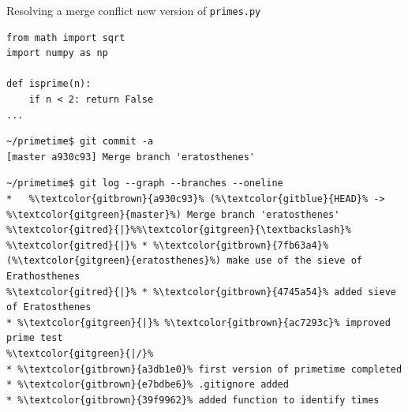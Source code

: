 \documentclass[svgnames]{beamer}
\begin{document}
\begin{frame}[fragile]{Resolving a merge conflict}
 new version of \texttt{primes.py}
 \begin{lstlisting}
from math import sqrt
import numpy as np

def isprime(n):
    if n < 2: return False
...
 \end{lstlisting}
 \begin{lstlisting}
~/primetime$ git commit -a
[master a930c93] Merge branch 'eratosthenes'
 \end{lstlisting}
 \begin{lstlisting}[escapechar=\%]
~/primetime$ git log --graph --branches --oneline
*   %\textcolor{gitbrown}{a930c93}% (%\textcolor{gitblue}{HEAD}% -> %\textcolor{gitgreen}{master}%) Merge branch 'eratosthenes'
%\textcolor{gitred}{|}%%\textcolor{gitgreen}{\textbackslash}%
%\textcolor{gitred}{|}% * %\textcolor{gitbrown}{7fb63a4}% (%\textcolor{gitgreen}{eratosthenes}%) make use of the sieve of Erathosthenes
%\textcolor{gitred}{|}% * %\textcolor{gitbrown}{4745a54}% added sieve of Eratosthenes
* %\textcolor{gitgreen}{|}% %\textcolor{gitbrown}{ac7293c}% improved prime test
%\textcolor{gitgreen}{|/}%
* %\textcolor{gitbrown}{a3db1e0}% first version of primetime completed
* %\textcolor{gitbrown}{e7bdbe6}% .gitignore added
* %\textcolor{gitbrown}{39f9962}% added function to identify times
 \end{lstlisting}
\end{frame}
\end{document}
